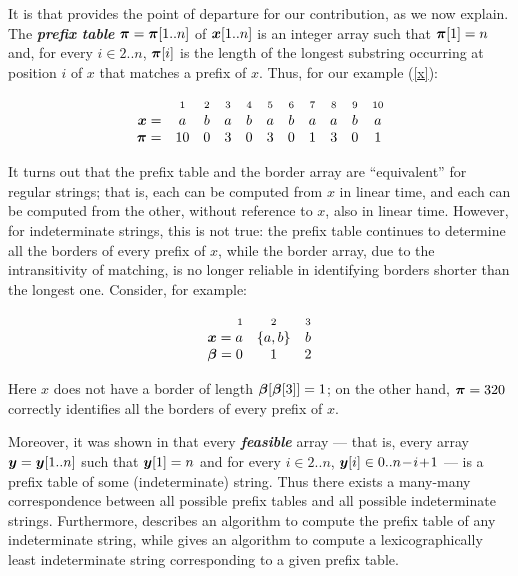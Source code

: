 \documentclass[runningheads,a4paper]{llncs}
\def\s#1{\mbox{\boldmath $#1$}}
\def\+{\!+\!}
\def\-{\!-\!}
\def\itbf#1{\textit{\textbf{#1}}}
\begin{document}
It is \cite{CRSW13} that provides the point of departure for our contribution,
as we now explain.
The \itbf{prefix table} $\s{\pi} = \s{\pi}[1..n]$ of $\s{x}[1..n]$ is an
integer array such that $\s{\pi}[1] = n$ and,
for every $i \in 2..n$, $\s{\pi}[i]$ is the length of the longest substring
occurring at position $i$ of \s{x} that matches a prefix of \s{x}.
Thus, for our example (\ref{x}):

\begin{equation*}
\begin{array}{rccccccccccc}
& \scriptstyle 1 & \scriptstyle 2 & \scriptstyle 3 & \scriptstyle 4 & \scriptstyle 5 & \scriptstyle 6 & \scriptstyle 7 & \scriptstyle 8 & \scriptstyle 9 & \scriptstyle 10 \\
\s{x} 	= & a & b & a & b & a & b & a & a & b & a\\
\s{\pi} = & 10 & 0 & 3 & 0 & 3 & 0 & 1 & 3 & 0 & 1
\end{array}
\end{equation*} 

It turns out \cite{BKS13} that the prefix table and the border array
are ``equivalent'' for regular strings; that is,
each can be computed from \s{x} in linear time,
and each can be computed from the other,
without reference to \s{x}, also in linear time.
However, for indeterminate strings, this is not true:
the prefix table
continues to determine all the borders of every prefix of \s{x},
while the border array, due to the intransitivity of matching,
is no longer reliable in identifying borders shorter than the longest one.
Consider, for example:

\begin{equation*}
\begin{array}{rccc}
\scriptstyle 1 & \scriptstyle 2 & \scriptstyle 3 \\
\s{x} = a & \{a,b\} & b \\
\s{\beta} = 0 & 1 & 2
\end{array}
\end{equation*}

Here \s{x} does not have a border of length $\s{\beta}[\s{\beta}[3]] = 1$;
on the other hand, $\s{\pi} = 320$ correctly identifies
all the borders of every prefix of \s{x}.



Moreover, it was shown in \cite{CRSW13} that every \itbf{feasible} array --- that is,
every array $\s{y} = \s{y}[1..n]$ such that $\s{y}[1] = n$
and for every $i \in 2..n$, $\s{y}[i] \in 0..n\- i\+ 1$ --- is a
prefix table of some (indeterminate) string.
Thus there exists a many-many correspondence between all possible
prefix tables and all possible indeterminate strings.
Furthermore, \cite{SW08} describes an algorithm to compute
the prefix table of any indeterminate string,
while \cite{ARS14} gives an algorithm to compute a
lexicographically least indeterminate string
corresponding to a given prefix table.
\end{document}
